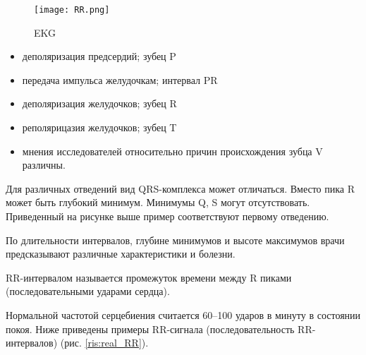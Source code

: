 \begin{figure}[h!]
	\begin{center}
		\texttt{[image: RR.png]}
		\caption{EKG}
		\label{ris:EKG}
	\end{center}
\end{figure}

\begin{itemize}
	\item деполяризация предсердий; зубец P
	\item передача импульса желудочкам; интервал PR
	\item деполяризация желудочков; зубец R
	\item реполярицазия желудочков; зубец T
	\item мнения исследователей относительно причин происхождения зубца V различны.
\end{itemize}

Для различных отведений вид QRS-комплекса может отличаться. Вместо пика R может быть глубокий минимум. Минимумы Q, S могут отсутствовать. Приведенный на рисунке выше пример соответствуют первому отведению.

По длительности интервалов, глубине минимумов и высоте максимумов врачи предсказывают различные характеристики и болезни.

RR-интервалом называется промежуток времени между R пиками (последовательными ударами сердца).

Нормальной частотой серцебиения считается 60--100 ударов в минуту в состоянии покоя. Ниже приведены примеры RR-сигнала (последовательность RR-интервалов) (рис. \ref{ris:real_RR}).

